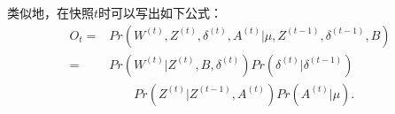 类似地，在快照$t$时可以写出如下公式：
\begin{align}
O_t = & Pr(W^{(t)}, Z^{(t)}, \delta^{(t)}, A^{(t)} |\mu, Z^{(t-1)}, \delta^{(t-1)}, B) \nonumber\\
= & Pr(W^{(t)}|Z^{(t)},B,\delta^{(t)})  Pr(\delta^{(t)}|\delta^{(t-1)}) \nonumber\\ 
&\qquad Pr(Z^{(t)}|Z^{(t-1)}, A^{(t)}) Pr(A^{(t)} | \mu).
\label{eq:O2}
\end{align}






